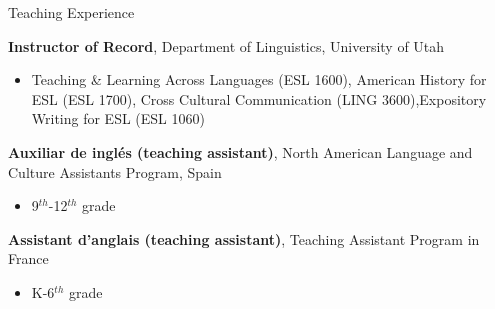 \begin{rubric}{Teaching Experience}

    \entry*[2010 -- 2013][\faChalkboardTeacher]%
        \textbf{Instructor of Record}, Department of Linguistics, University of Utah
        
        \begin{itemize}
        \item[] Teaching \& Learning Across Languages (ESL 1600), American History for ESL (ESL 1700), Cross Cultural Communication (LING 3600),Expository Writing for ESL (ESL 1060) 
        \end{itemize}
    
    
    \entry*[2009 -- 2010][\faChalkboardTeacher]%
        \textbf{Auxiliar de ingl\'{e}s (teaching assistant)}, North American Language and Culture Assistants Program, Spain
        
        \begin{itemize}
        \item 9$^{th}$-12$^{th}$ grade
        \end{itemize}
        
    \entry*[2008 -- 2009][\faChalkboardTeacher]%
        \textbf{Assistant d'anglais (teaching assistant)}, Teaching Assistant Program in France
        
        \begin{itemize}
        \item K-6$^{th}$ grade
        
        \end{itemize}
    \end{rubric}